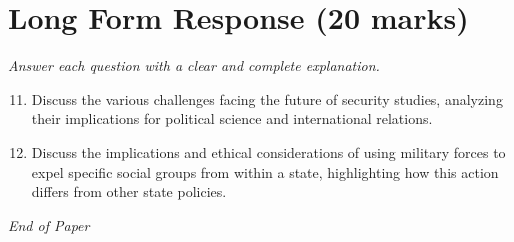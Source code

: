 \documentclass[12pt]{article}
\begin{document}
\section*{Long Form Response (20 marks)}
\textit{Answer each question with a clear and complete explanation.}
\begin{enumerate}[label=\arabic*.]
\setcounter{enumi}{10}
\item Discuss the various challenges facing the future of security studies, analyzing their implications for political science and international relations.
\item Discuss the implications and ethical considerations of using military forces to expel specific social groups from within a state, highlighting how this action differs from other state policies.
\end{enumerate}

\vfill
\noindent\textit{End of Paper}
\end{document}
